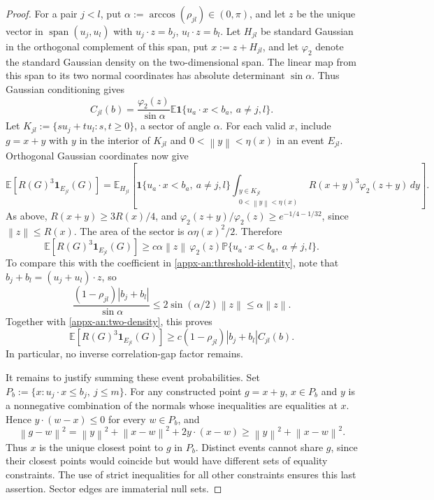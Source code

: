 \documentclass[11pt,letterpaper]{article}
\theoremstyle{remark}
\newcommand{\E}{\mathbb E}
\newcommand{\Pp}{\mathbb P}
\newcommand{\norm}[1]{\left\lVert#1\right\rVert}
\newcommand{\ind}{\mathbf 1}
\begin{document}
\begin{proof}
For a pair \(j<l\), put \(\alpha:=\arccos(\rho_{jl})\in(0,\pi)\),
and let \(z\) be the unique vector in \(\operatorname{span}(u_j,u_l)\)
with \(u_j\cdot z=b_j\), \(u_l\cdot z=b_l\).
Let \(H_{jl}\) be standard Gaussian in the orthogonal complement of
this span, put \(x:=z+H_{jl}\), and let \(\varphi_2\) denote the
standard Gaussian density on the two-dimensional span.
The linear map from this span to its two normal coordinates has
absolute determinant \(\sin\alpha\). Thus Gaussian conditioning gives
\begin{equation}
 C_{jl}(b)=\frac{\varphi_2(z)}{\sin\alpha}
       \E\ind\{u_a\cdot x<b_a,\ a\ne j,l\}.
 \label{appx-an:two-density}
\end{equation}
Let \(K_{jl}:=\{s u_j+t u_l:s,t\ge0\}\), a sector of angle \(\alpha\).
For each valid \(x\), include \(g=x+y\) with
\(y\) in the interior of \(K_{jl}\) and
\(0<\norm y<\eta(x)\) in an event \(E_{jl}\).
Orthogonal Gaussian coordinates now give
\[
 \E[R(G)^3\ind_{E_{jl}}(G)]
 =\E_{H_{jl}}\left[
  \ind\{u_a\cdot x<b_a,\ a\ne j,l\}
  \int_{\substack{y\in K_{jl}\\0<\norm y<\eta(x)}}
           R(x+y)^3\varphi_2(z+y)\,dy\right].
\]
As above, \(R(x+y)\ge3R(x)/4\), and
\(\varphi_2(z+y)/\varphi_2(z)\ge e^{-1/4-1/32}\), since
\(\norm z\le R(x)\).
The area of the sector is \(\alpha\eta(x)^2/2\).
Therefore
\[
 \E[R(G)^3\ind_{E_{jl}}(G)]
 \ge c\alpha\norm z\,\varphi_2(z)
        \Pp\{u_a\cdot x<b_a,\ a\ne j,l\}.
\]
To compare this with the coefficient in \eqref{appx-an:threshold-identity}, note
that \(b_j+b_l=(u_j+u_l)\cdot z\), so
\[
 \frac{(1-\rho_{jl})|b_j+b_l|}{\sin\alpha}
 \le 2\sin(\alpha/2)\norm z\le\alpha\norm z.
\]
Together with \eqref{appx-an:two-density}, this proves
\begin{equation}
 \E[R(G)^3\ind_{E_{jl}}(G)]
 \ge c(1-\rho_{jl})|b_j+b_l|C_{jl}(b).
 \label{appx-an:two-region}
\end{equation}
In particular, no inverse correlation-gap factor remains.

It remains to justify summing these event probabilities.
Set \(P_b:=\{x:u_j\cdot x\le b_j,\ j\le m\}\).
For any constructed point \(g=x+y\), \(x\in P_b\) and \(y\)
is a nonnegative combination of the normals whose inequalities
are equalities at \(x\). Hence
\(y\cdot(w-x)\le0\) for every \(w\in P_b\), and
\[
 \norm{g-w}^2
 =\norm y^2+\norm{x-w}^2+2y\cdot(x-w)
 \ge\norm y^2+\norm{x-w}^2.
\]
Thus \(x\) is the unique closest point to \(g\) in \(P_b\).
Distinct events cannot share \(g\), since their closest points
would coincide but would have different sets of equality constraints.
The use of strict inequalities for all other constraints ensures this
last assertion. Sector edges are immaterial null sets.


\end{proof}
\end{document}
